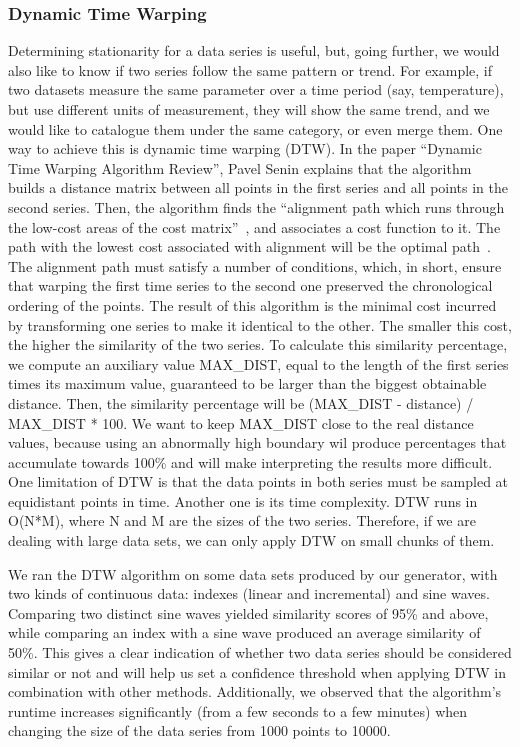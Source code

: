 \bigbreak

\subsubsection{Dynamic Time Warping}
Determining stationarity for a data series is useful, but, going further, we would also like to know if two series follow
the same pattern or trend.
For example, if two datasets measure the same parameter over a time period (say, temperature), but use different units of
measurement, they will show the same trend, and we would like to catalogue them under the same category, or even merge them.
One way to achieve this is dynamic time warping (DTW).
In the paper ``Dynamic Time Warping Algorithm Review'', Pavel Senin explains that the algorithm builds a distance matrix
between all points in the first series and all points in the second series.
Then, the algorithm finds the ``alignment path which runs through the low-cost areas of the cost matrix''~\cite{DTWAlgorithmReview},
and associates a cost function to it.
The path with the lowest cost associated with alignment will be the optimal path~\cite{DTWAlgorithmReview}.
The alignment path must satisfy a number of conditions, which, in short, ensure that warping the first time series to the second one
preserved the chronological ordering of the points.
The result of this algorithm is the minimal cost incurred by transforming one series to make it identical to the other.
The smaller this cost, the higher the similarity of the two series.
To calculate this similarity percentage, we compute an auxiliary value MAX\_DIST, equal to the length of the first series
times its maximum value, guaranteed to be larger than the biggest obtainable distance.
Then, the similarity percentage will be (MAX\_DIST - distance) / MAX\_DIST * 100.
We want to keep MAX\_DIST close to the real distance values, because using an abnormally high boundary wil produce percentages
that accumulate towards 100\% and will make interpreting the results more difficult.
One limitation of DTW is that the data points in both series must be sampled at equidistant points in time.
Another one is its time complexity.
DTW runs in O(N*M), where N and M are the sizes of the two series.
Therefore, if we are dealing with large data sets, we can only apply DTW on small chunks of them.

\bigbreak

We ran the DTW algorithm on some data sets produced by our generator, with two kinds of continuous data: indexes (linear and
incremental) and sine waves.
Comparing two distinct sine waves yielded similarity scores of 95\% and above, while comparing an index with a sine wave produced
an average similarity of 50\%.
This gives a clear indication of whether two data series should be considered similar or not and will help us set a confidence
threshold when applying DTW in combination with other methods.
Additionally, we observed that the algorithm's runtime increases significantly (from a few seconds to a few minutes) when
changing the size of the data series from 1000 points to 10000.

